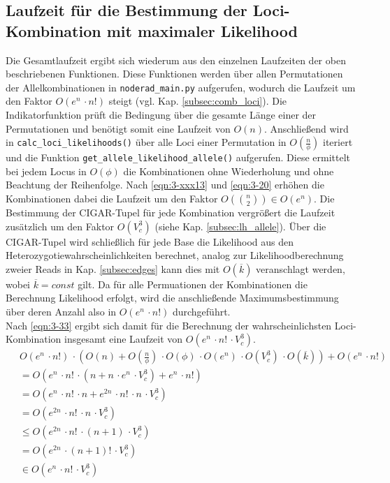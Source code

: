 \subsection{Laufzeit für die Bestimmung der Loci-Kombination mit maximaler Likelihood} \label{subsec:loc_compl}
Die Gesamtlaufzeit ergibt sich wiederum aus den einzelnen Laufzeiten der oben beschriebenen Funktionen. Diese Funktionen werden über allen Permutationen der Allelkombinationen in \lstinline|noderad_main.py| aufgerufen, wodurch die Laufzeit um den Faktor $ O(e^n \, \cdotp n!)$ steigt (vgl. Kap. \ref{subsec:comb_loci}). Die Indikatorfunktion prüft die Bedingung über die gesamte Länge einer der Permutationen und benötigt somit eine Laufzeit von $ O(n) $. Anschließend wird in \lstinline|calc_loci_likelihoods()| über alle Loci einer Permutation in $ O(\frac{n}{\phi}) $ iteriert und die Funktion \lstinline|get_allele_likelihood_allele()| aufgerufen. Diese ermittelt bei jedem Locus in $O(\phi) $ die Kombinationen ohne Wiederholung und ohne Beachtung der Reihenfolge. Nach \eqref{eqn:3-xxx13} und \eqref{eqn:3-20} erhöhen die Kombinationen dabei die Laufzeit um den Faktor $ O(\binom{n}{2}) \in O(e^n) $. Die Bestimmung der CIGAR-Tupel für jede Kombination vergrößert die Laufzeit zusätzlich um den Faktor $O(V_{c}^3)$ (siehe Kap. \ref{subsec:lh_allele}). Über die CIGAR-Tupel wird schließlich für jede Base die Likelihood aus den Heterozygotiewahrscheinlichkeiten berechnet, analog zur Likelihoodberechnung zweier Reads in Kap. \ref{subsec:edges} kann dies mit $O(\overline{k}) $ veranschlagt werden, wobei $\overline{k}=const$ gilt. Da für alle Permuationen der Kombinationen die Berechnung Likelihood erfolgt, wird die anschließende Maximumsbestimmung über deren Anzahl also in $O(e^n\, \cdotp n!) $ durchgeführt.\\

Nach \eqref{eqn:3-33} ergibt sich damit für die Berechnung der wahrscheinlichsten Loci-Kombination insgesamt eine Laufzeit von $ O(e^n \, \cdotp n! \, \cdotp V_{c}^3)$.
\begin{equation} \label{eqn:3-33}
\tag{3-33}
\begin{aligned}
&\ {}O(e^n \, \cdotp n!) \, \cdotp \left( O(n) + O\left( \frac{n}{\phi} \right) \, \cdotp O(\phi) \, \cdotp O(e^n)  \, \cdotp O(V_{c}^3) \, \cdotp O(\overline{k})\right) + O(e^n\, \cdotp n!) \\
&\ =O(e^n \, \cdotp n! \, \cdotp(n + n \, \cdotp e^n \, \cdotp V_{c}^3)+ e^n\, \cdotp n!)  \\
&\ =O(e^n \, \cdotp n! \, \cdotp n + e^{2n} \, \cdotp n! \, \cdotp n \, \cdotp V_{c}^3)\\
&\ =O(e^{2n} \, \cdotp n! \, \cdotp n \, \cdotp V_{c}^3)\\
&\ \leq O(e^{2n} \, \cdotp n! \, \cdotp (n + 1) \, \cdotp V_{c}^3)\\
&\ = O(e^{2n} \, \cdotp (n + 1)! \, \cdotp V_{c}^3)\\
&\ \in O(e^n \, \cdotp n! \, \cdotp V_{c}^3)\\
\end{aligned}
\end{equation}

